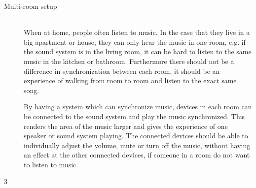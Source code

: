 \begin{description}
    \item[Multi-room setup] \hfill\\
        When at home, people often listen to music.
        In the case that they live in a big apartment or house, they can only hear the music in one room,
        e.g. if the sound system is in the living room, it can be hard to listen to the same music in the kitchen or bathroom.
        Furthermore there should not be a difference in synchronization between each room,
        it should be an experience of walking from room to room and listen to the exact same song.

        By having a system which can synchronize music, devices in each room can be connected to the sound system and play the music synchronized.
        This renders the area of the music larger and gives the experience of one speaker or sound system playing.
        The connected devices should be able to individually adjust the volume, mute or turn off the music,
        without having an effect at the other connected devices, if someone in a room do not want to listen to music. 

\end{description}
3
